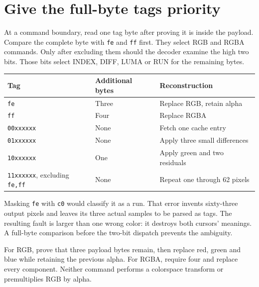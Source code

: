 \section{Give the full-byte tags priority}
At a command boundary, read one tag byte after proving it is inside the payload. Compare
the complete byte with \texttt{fe} and \texttt{ff} first. They select RGB and RGBA
commands. Only after excluding them should the decoder examine the high two bits.
Those bits select INDEX, DIFF, LUMA or RUN for the remaining bytes.

\begin{center}
  \begin{tabular}{lll}
    Tag                                         & Additional bytes & Reconstruction                \\
    \hline
    \texttt{fe}                                 & Three            & Replace RGB, retain alpha     \\
    \texttt{ff}                                 & Four             & Replace RGBA                  \\
    \texttt{00xxxxxx}                           & None             & Fetch one cache entry         \\
    \texttt{01xxxxxx}                           & None             & Apply three small differences \\
    \texttt{10xxxxxx}                           & One              & Apply green and two residuals \\
    \texttt{11xxxxxx}, excluding \texttt{fe,ff} & None             & Repeat one through 62 pixels  \\
  \end{tabular}
\end{center}

Masking \texttt{fe} with \texttt{c0} would classify it as a run. That error invents
sixty-three output pixels and leaves its three actual samples to be parsed as tags.
The resulting fault is larger than one wrong color: it destroys both cursors' meanings.
A full-byte comparison before the two-bit dispatch prevents the ambiguity.

For RGB, prove that three payload bytes remain, then replace red, green and blue while
retaining the previous alpha. For RGBA, require four and replace every component.
Neither command performs a colorspace transform or premultiplies RGB by alpha.
